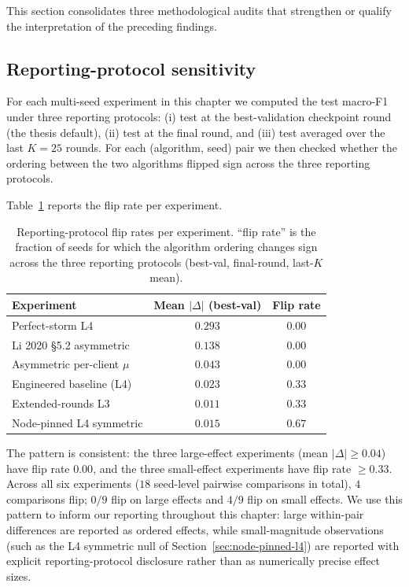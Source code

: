 \documentclass[11pt,a4paper]{report}
\begin{document}
This section consolidates three methodological audits that strengthen
or qualify the interpretation of the preceding findings.

\subsection{Reporting-protocol sensitivity}
\label{sec:robustness-protocol-flip}

For each multi-seed experiment in this chapter we computed the test
macro-F1 under three reporting protocols: (i) test at the best-validation
checkpoint round (the thesis default), (ii) test at the final round, and
(iii) test averaged over the last $K = 25$ rounds. For each (algorithm,
seed) pair we then checked whether the ordering between the two algorithms
flipped sign across the three reporting protocols.

Table~\ref{tab:protocol-flip} reports the flip rate per experiment.

\begin{table}[!htbp]
\centering
\caption{Reporting-protocol flip rates per experiment. ``flip rate''
is the fraction of seeds for which the algorithm ordering changes
sign across the three reporting protocols (best-val, final-round,
last-$K$ mean).}
\label{tab:protocol-flip}
\small
\begin{tabular}{lcc}
\toprule
Experiment & Mean $|\Delta|$ (best-val) & Flip rate \\
\midrule
Perfect-storm L4               & $0.293$ & $0.00$ \\
Li 2020 §5.2 asymmetric         & $0.138$ & $0.00$ \\
Asymmetric per-client $\mu$     & $0.043$ & $0.00$ \\
Engineered baseline (L4)        & $0.023$ & $0.33$ \\
Extended-rounds L3              & $0.011$ & $0.33$ \\
Node-pinned L4 symmetric        & $0.015$ & $0.67$ \\
\bottomrule
\end{tabular}
\end{table}

The pattern is consistent: the three large-effect experiments (mean
$|\Delta| \geq 0.04$) have flip rate $0.00$, and the three small-effect
experiments have flip rate $\geq 0.33$. Across all six experiments
($18$ seed-level pairwise comparisons in total), $4$ comparisons flip;
$0/9$ flip on large effects and $4/9$ flip on small effects. We use
this pattern to inform our reporting throughout this chapter: large
within-pair differences are reported as ordered effects, while
small-magnitude observations (such as the L4 symmetric null of
Section~\ref{sec:node-pinned-l4}) are reported with explicit
reporting-protocol disclosure rather than as numerically precise effect
sizes.
\end{document}
